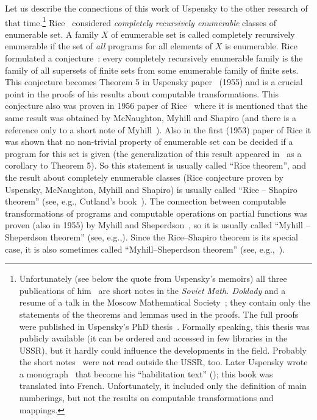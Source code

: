\documentclass[12pt]{article}
\theoremstyle{remark}
\begin{document}
Let us describe the connections of this work of Uspensky to the other research of that time.\footnote{Unfortunately (see below the quote from Uspensky's memoirs) all three publications of him~\cite{1955,1955a,1956} are short notes in the \emph{Soviet Math. Doklady}\cite{1955,1955a} and a resume of a talk in the Moscow Mathematical Society~\cite{1956}; they contain only the statements of the theorems and lemmas used in the proofs. The full proofs were published in Uspensky's PhD thesis~\cite{1955b}. Formally speaking, this thesis was publicly available (it can be ordered and accessed in few libraries in the USSR), but it hardly could influence the developments in the field. Probably the short notes~\cite{1955,1955a,1956} were not read outside the USSR, too. Later Uspensky wrote a monograph~\cite{1960} that become his ``habilitation text'' (); this book was translated into French. Unfortunately, it included only the definition of main numberings, but not the results on computable transformations and mappings.} Rice~\cite{Rice1953} considered \emph{completely recursively enumerable} classes of enumerable set. A family $X$ of enumerable set is called completely recursively enumerable if the set of \emph{all} programs for all elements of $X$ is enumerable. Rice formulated a conjecture~\cite[p.361]{Rice1953}: every completely recursively enumerable family is the family of all supersets of finite sets from some enumerable family of finite sets. This conjecture becomes Theorem 5 in Uspensky paper~\cite[Theorem 5]{1955a} (1955) and is a crucial point in the proofs of his results about computable transformations. This conjecture also was proven in 1956 paper of Rice~\cite{Rice1956} where it is mentioned that the same result was obtained by McNaughton, Myhill and Shapiro (and there is a reference only to a short note of Myhill~\cite{Myhill1955}). Also in the first (1953) paper of Rice it was shown that no non-trivial property of enumerable set can be decided if a program for this set is given (the generalization of this result appeared in~\cite{1955a} as a corollary to Theorem 5). So this statement is usually called ``Rice theorem'', and the result about completely enumerable classes (Rice conjecture proven by Uspensky, McNaughton, Myhill and Shapiro) is usually called ``Rice -- Shapiro theorem'' (see, e.g., Cutland's book~\cite[Chapter 7, \S 2]{Cutland1980}). The connection between computable transformations of programs and computable operations on partial functions was proven (also in 1955) by Myhill and Sheperdson~\cite{MyhillSheperdson1955}, so it is usually called ``Myhill -- Sheperdson theorem''  (see, e.g.,\cite[Chapter 10, \S 2]{Cutland1980}). Since the Rice--Shapiro theorem is its special case, it is also sometimes called ``Myhill--Sheperdson theorem'' (see, e.g.,~\cite[Theorem II.4.2 or Proposition II.5.19]{Odifreddi1989}).
\end{document}
